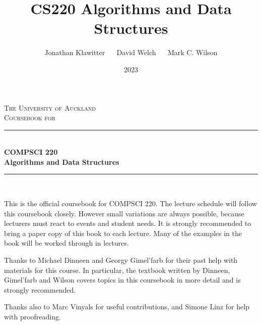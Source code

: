 \documentclass[11pt,twoside,openany]{memoir}
\theoremstyle{definition}
\numberwithin{Lemma}{chapter}
\numberwithin{Exercise}{section}
\begin{document}
\title{CS220 Algorithms and Data Structures}
\author{Jonathan Klawitter $\quad$ David Welch $\quad$ Mark C. Wilson}
\date{2023}

\begin{titlingpage}
	\newcommand{\HRule}{\rule{\linewidth}{0.5mm}}
	\setlength{\droptitle}{30pt} 
	\begin{adjustwidth*}{1cm}{-2cm}
	\centering
	
	
	\vspace*{0.4cm}
	\textsc{\LARGE The University of Auckland}\\[3cm]
	
	\textsc{\Large Coursebook for}\\[0.4cm]
	
	\HRule\\[0.5cm]
	\Huge{\bfseries COMPSCI 220\\ 
	Algorithms and Data Structures}\\[0.1cm]
	\HRule\\[0.5cm]
	\Large{\thedate}
	
	\vspace*{2.4cm}
	\LARGE{\theauthor}
	
	\end{adjustwidth*}
	
\end{titlingpage}


\setcounter{page}{1}

\thispagestyle{empty}
This is the official coursebook for COMPSCI 220. The lecture schedule will follow this coursebook closely. 
However small variations are always possible, because lecturers must react to events and student needs. 
It is strongly recommended to bring a paper copy of this book to each lecture. Many of the examples in the book will be worked through in lectures.

Thanks to Michael Dinneen and Georgy Gimel'farb for their past help with materials for this course. 
In particular, the textbook written by Dinneen, Gimel'farb and Wilson covers topics in this coursebook in more detail and is strongly recommended.

Thanks also to Marc Vinyals for useful contributions, and Simone Linz for help with proofreading.

\vfill
\doclicenseThis

\clearpage
\setcounter{tocdepth}{0}
\tableofcontents*

\pagestyle{220coursebook}

 






\end{document}
